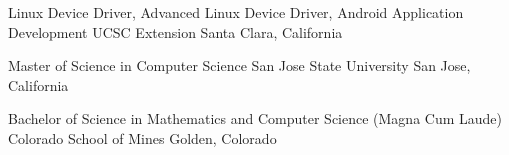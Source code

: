 \documentclass[11pt, a4paper]{awesome-cv}
\begin{document}
\begin{cventries}

  \cventry
    {Linux Device Driver, Advanced Linux Device Driver, Android Application Development} %
    {UCSC Extension} %
    {Santa Clara, California} %
    {} %
    {}
    
  \cventry
    {Master of Science in Computer Science} %
    {San Jose State University} %
    {San Jose, California} %
    {} %
    {}    
    
  \cventry
    {Bachelor of Science in Mathematics and Computer Science (Magna Cum Laude)} %
    {Colorado School of Mines} %
    {Golden, Colorado} %
    {} %
    {}        

\end{cventries}



\end{document}
